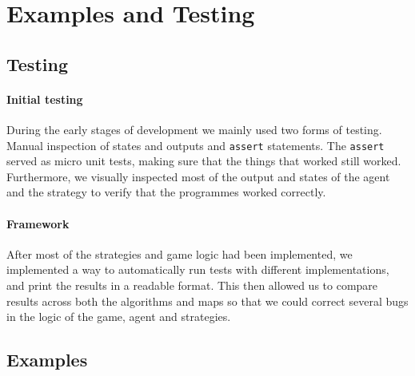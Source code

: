 \documentclass[british]{article}
\newcommand{\code}[1]{\texttt{#1}}
\begin{document}
\section{Examples and Testing}
\label{sec:testing}

\subsection{Testing}
\label{subsec:testing}
\paragraph{Initial testing} During the early stages of development we mainly used two forms of testing. Manual inspection of states and outputs and \code{assert} statements. The \code{assert} served as micro unit tests, making sure that the things that worked still worked. Furthermore, we visually inspected most of the output and states of the agent and the strategy to verify that the programmes worked correctly.
\paragraph{Framework} After most of the strategies and game logic had been implemented, we implemented a way to automatically run tests with different implementations, and print the results in a readable format. This then allowed us to compare results across both the algorithms and maps so that we could correct several bugs in the logic of the game, agent and strategies.

\subsection{Examples}
\label{example}
\end{document}
